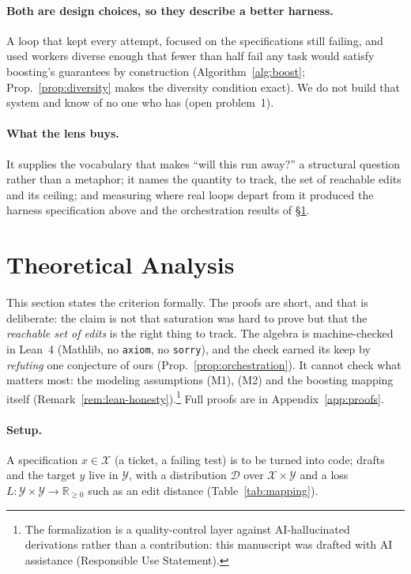 \documentclass{article}
\theoremstyle{remark}
\theoremstyle{plain}
\newcommand{\X}{\mathcal{X}}
\newcommand{\Y}{\mathcal{Y}}
\newcommand{\D}{\mathcal{D}}
\begin{document}
\paragraph{Both are design choices, so they describe a better harness.} A loop that kept every attempt, focused on the specifications still failing, and used workers diverse enough that fewer than half fail any task would satisfy boosting's guarantees by construction (Algorithm~\ref{alg:boost}; Prop.~\ref{prop:diversity} makes the diversity condition exact). We do not build that system and know of no one who has (open problem~1).

\paragraph{What the lens buys.} It supplies the vocabulary that makes ``will this run away?'' a structural question rather than a metaphor; it names the quantity to track, the set of reachable edits and its ceiling; and measuring where real loops depart from it produced the harness specification above and the orchestration results of \S\ref{sec:theory}.

\section{Theoretical Analysis}
\label{sec:theory}

This section states the criterion formally. The proofs are short, and that is deliberate: the claim is not that saturation was hard to prove but that the \emph{reachable set of edits} is the right thing to track. The algebra is machine-checked in Lean~4 (Mathlib, no \texttt{axiom}, no \texttt{sorry}), and the check earned its keep by \emph{refuting} one conjecture of ours (Prop.~\ref{prop:orchestration}). It cannot check what matters most: the modeling assumptions (M1), (M2) and the boosting mapping itself (Remark~\ref{rem:lean-honesty}).\footnote{The formalization is a quality-control layer against AI-hallucinated derivations rather than a contribution: this manuscript was drafted with AI assistance (Responsible Use Statement).} Full proofs are in Appendix~\ref{app:proofs}.

\paragraph{Setup.} A specification $x\in\X$ (a ticket, a failing test) is to be turned into code; drafts and the target $y$ live in $\Y$, with a distribution $\D$ over $\X\times\Y$ and a loss $L:\Y\times\Y\to\mathbb{R}_{\ge0}$ such as an edit distance (Table~\ref{tab:mapping}).
\end{document}
